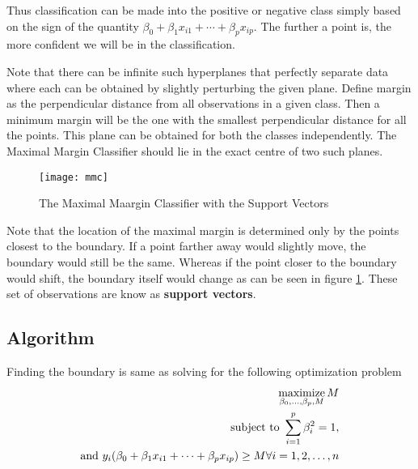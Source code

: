 \documentclass[../statistical_learning_notes.tex]{subfiles}
\begin{document}
    Thus classification can be made into the positive or negative class simply based on the sign of the quantity $\beta_{0} + \beta_{1}x_{i1} + \cdots + \beta_{p}x_{ip}$. The further a point is, the more confident we will be in the classification.\newline

    Note that there can be infinite such hyperplanes that perfectly separate data where each can be obtained by slightly perturbing the given plane. Define margin as the perpendicular distance from all observations in a given class. Then a minimum margin will be the one with the smallest perpendicular distance for all the points. This plane can be obtained for both the classes independently. The Maximal Margin Classifier should lie in the exact centre of two such planes.\newline

    \begin{figure}[h]
    \texttt{[image: mmc]}
    \centering
    \caption{The Maximal Maargin Classifier with the Support Vectors}
    \label{fig:mmc} %
    \end{figure}

    Note that the location of the maximal margin is determined only by the points closest to the boundary. If a point farther away would slightly move, the boundary would still be the same. Whereas if the point closer to the boundary would shift, the boundary itself would change as can be seen in figure \ref{fig:mmc}. These set of observations are know as \textbf{support vectors}.

    
    \subsection{Algorithm}
    Finding the boundary is same as solving for the following optimization problem
    \begin{align*}
        \operatorname*{maximize}_{\beta_{0},\ldots,\beta_{p}, M} M\\
        \text{subject to } \sum_{i=1}^{p} \beta_{i}^{2} = 1,\\
        \text{and } y_{i}(\beta_{0} + \beta_{1}x_{i1} + \cdots + \beta_{p}x_{ip}) \geq M \forall i = 1, 2, \ldots, n
    \end{align*}

    
\end{document}
